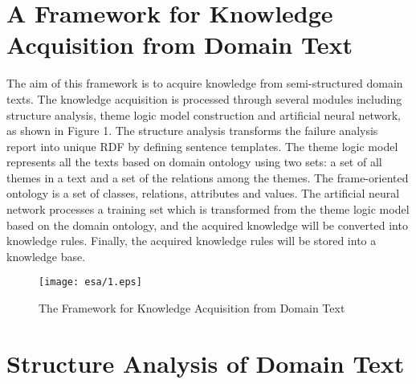 \documentclass{elsarticle}
\begin{document}
\section{A Framework for Knowledge Acquisition from Domain Text
}
\label{sec:fram-knowl-acqu}

The aim of this framework is to acquire knowledge from semi-structured
domain texts. The knowledge acquisition is processed through several
modules including structure analysis, theme logic model construction
and artificial neural network, as shown in Figure 1. The structure
analysis transforms the failure analysis report into unique RDF by
defining sentence templates. The theme logic model represents all the
texts based on domain ontology using two sets: a set of all themes in
a text and a set of the relations among the themes. The frame-oriented ontology is a set of classes, relations, attributes and
values. The artificial neural network processes a training set which is 
transformed from the theme logic model based on the domain ontology,
and the acquired knowledge will be converted into knowledge rules. Finally, the acquired knowledge rules will be stored into a knowledge base.
\begin{figure}[htp]
  \centering
  \texttt{[image: esa/1.eps]}

  \caption{The Framework for Knowledge Acquisition from Domain Text}
  \label{fig:1}
\end{figure}

\section{Structure Analysis of Domain Text 
}
\label{sec:struct-analys-doma}
\end{document}

